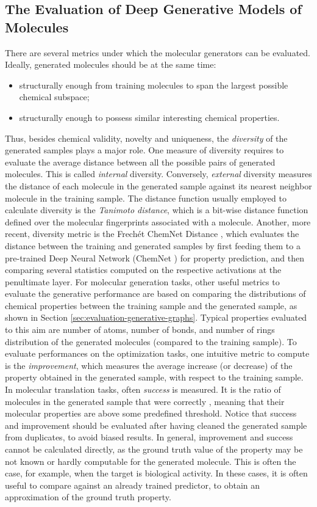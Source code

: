 \subsection{The Evaluation of Deep Generative Models of Molecules}
There are several metrics under which the molecular generators can be evaluated. Ideally, generated molecules should be at the same time:
\begin{itemize}
    \item structurally  enough from training molecules to span the largest possible chemical subspace;
    \item structurally  enough to possess similar interesting chemical properties.
\end{itemize}
Thus, besides chemical validity, novelty and uniqueness, the \emph{diversity} of the generated samples plays a major role. One measure of diversity requires to evaluate the average distance between all the possible pairs of generated molecules. This is called \emph{internal} diversity. Conversely, \emph{external} diversity measures the distance of each molecule in the generated sample against its nearest neighbor molecule in the training sample. The distance function usually employed to calculate diversity is the \emph{Tanimoto distance}, which is a bit-wise distance function defined over the molecular fingerprints associated with a molecule. Another, more recent, diversity metric is the Frechét ChemNet Distance \cite{preuer2018frechetdistance}, which evaluates the distance between the training and generated samples by first feeding them to a pre-trained Deep Neural Network (ChemNet \cite{goh2017chemnet}) for property prediction, and then comparing several statistics computed on the respective activations at the penultimate layer.
For molecular generation tasks, other useful metrics to evaluate the generative performance are based on comparing the distributions of chemical properties between the training sample and the generated sample, as shown in Section \ref{sec:evaluation-generative-graphs}. Typical properties evaluated to this aim are number of atoms, number of bonds, and number of rings distribution of the generated molecules (compared to the training sample). To evaluate performances on the optimization tasks, one intuitive metric to compute is the \emph{improvement}, which measures the average increase (or decrease) of the property obtained in the generated sample, with respect to the training sample. In molecular translation tasks, often \emph{success} is measured. It is the ratio of molecules in the generated sample that were correctly , meaning that their molecular properties are above some predefined threshold. Notice that success and improvement should be evaluated after having cleaned the generated sample from duplicates, to avoid biased results. In general, improvement and success cannot be calculated directly, as the ground truth value of the property may be not known or hardly computable for the generated molecule. This is often the case, for example, when the target is biological activity. In these cases, it is often useful to compare against an already trained predictor, to obtain an approximation of the ground truth property.


